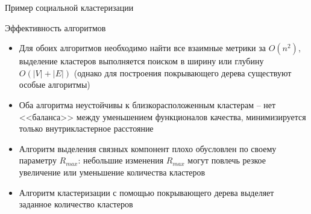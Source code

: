 \documentclass[compress,unicode]{beamer}
\begin{document}
\begin{frame}{Пример социальной кластеризации}
\end{frame}

\begin{frame}{Эффективность алгоритмов}
\begin{itemize}
	\item Для обоих алгоритмов необходимо найти все взаимные метрики за $O(n^2)$, выделение кластеров выполняется поиском в ширину или глубину $O(|V|+|E|)$ (однако для построения покрывающего дерева существуют особые алгоритмы)
	\item Оба алгоритма неустойчивы к близкорасположенным кластерам -- нет <<баланса>> между уменьшением функционалов качества, минимизируется только внутрикластерное расстояние
	\item Алгоритм выделения связных компонент плохо обусловлен по своему параметру $R_{max}$: небольшие изменения $R_{max}$ могут повлечь резкое увеличение или уменьшение количества кластеров
	\item Алгоритм кластеризации с помощью покрывающего дерева выделяет заданное количество кластеров
\end{itemize}
\end{frame}


\end{document}
